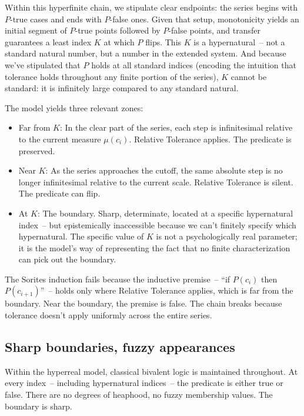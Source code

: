 Within this hyperfinite chain, we stipulate clear endpoints: the series begins with $P$-true cases and ends with $P$-false ones. Given that setup, monotonicity yields an initial segment of $P$-true points followed by $P$-false points, and transfer guarantees a least index $K$ at which $P$ flips. This $K$ is a hypernatural~-- not a standard natural number, but a number in the extended system. And because we've stipulated that $P$ holds at all standard indices (encoding the intuition that tolerance holds throughout any finite portion of the series), $K$ cannot be standard: it is infinitely large compared to any standard natural.

The model yields three relevant zones:

\begin{itemize}
\item Far from $K$: In the clear part of the series, each step is infinitesimal relative to the current measure $\mu(c_i)$. Relative Tolerance applies. The predicate is preserved.
\item Near $K$: As the series approaches the cutoff, the same absolute step is no longer infinitesimal relative to the current scale. Relative Tolerance is silent. The predicate can flip.
\item At $K$: The boundary. Sharp, determinate, located at a specific hypernatural index~-- but epistemically inaccessible because we can't finitely specify which hypernatural. The specific value of $K$ is not a psychologically real parameter; it is the model's way of representing the fact that no finite characterization can pick out the boundary.
\end{itemize}

The Sorites induction fails because the inductive premise~-- \enquote{if $P(c_i)$ then $P(c_{i+1})$}~-- holds only where Relative Tolerance applies, which is far from the boundary. Near the boundary, the premise is false. The chain breaks because tolerance doesn't apply uniformly across the entire series.

\subsection{Sharp boundaries, fuzzy appearances}
\label{subsec:5:sharp-fuzzy}

Within the hyperreal model, classical bivalent logic is maintained throughout. At every index~-- including hypernatural indices~-- the predicate is either true or false. There are no degrees of heaphood, no fuzzy membership values. The boundary is sharp.

